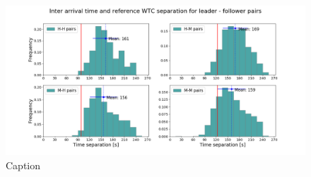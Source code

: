 \begin{figure}
    \centering
    \includegraphics[width=1\textwidth]{graphics/fig_time_separ_HH_HM_MH_MM_pairs.png}
    \caption[list of figures caption]{Caption}
    \label{fig:time_separ_HH_HM_MH_MM_pairs}
\end{figure}





